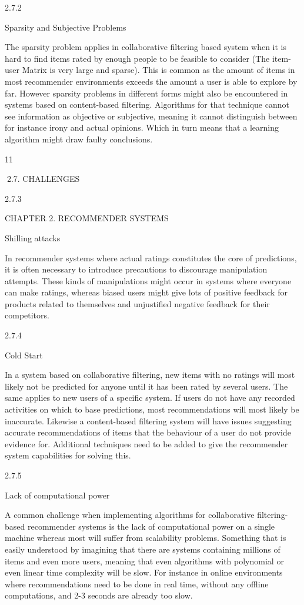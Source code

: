 2.7.2

Sparsity and Subjective Problems

The sparsity problem applies in collaborative filtering based system when it is hard to
find items rated by enough people to be feasible to consider (The item-user Matrix is
very large and sparse). This is common as the amount of items in most recommender
environments exceeds the amount a user is able to explore by far. However sparsity
problems in different forms might also be encountered in systems based on content-based
filtering. Algorithms for that technique cannot see information as objective or subjective,
meaning it cannot distinguish between for instance irony and actual opinions. Which in
turn means that a learning algorithm might draw faulty conclusions.

11

2.7. CHALLENGES

2.7.3

CHAPTER 2. RECOMMENDER SYSTEMS

Shilling attacks

In recommender systems where actual ratings constitutes the core of predictions, it is
often necessary to introduce precautions to discourage manipulation attempts. These
kinds of manipulations might occur in systems where everyone can make ratings, whereas
biased users might give lots of positive feedback for products related to themselves and
unjustified negative feedback for their competitors.

2.7.4

Cold Start

In a system based on collaborative filtering, new items with no ratings will most likely
not be predicted for anyone until it has been rated by several users. The same applies
to new users of a specific system. If users do not have any recorded activities on which
to base predictions, most recommendations will most likely be inaccurate. Likewise a
content-based filtering system will have issues suggesting accurate recommendations of
items that the behaviour of a user do not provide evidence for. Additional techniques
need to be added to give the recommender system capabilities for solving this.

2.7.5

Lack of computational power

A common challenge when implementing algorithms for collaborative filtering-based recommender systems is the lack of computational power on a single machine whereas most
will suffer from scalability problems. Something that is easily understood by imagining that there are systems containing millions of items and even more users, meaning
that even algorithms with polynomial or even linear time complexity will be slow. For
instance in online environments where recommendations need to be done in real time,
without any offline computations, and 2-3 seconds are already too slow.


